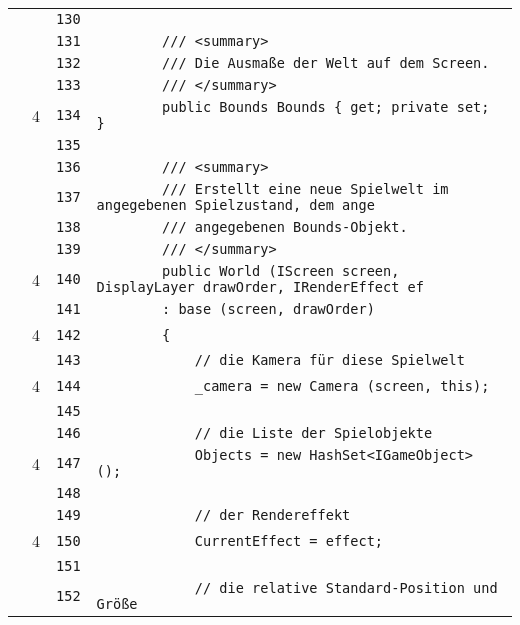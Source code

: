 \documentclass[a4paper,10pt]{article}
\begin{document}
\begin{longtable}[l]{lrrl}
\cellcolor{gray} &  & \verb~130~ & \verb~~\\
\cellcolor{gray} &  & \verb~131~ & \verb~        /// <summary>~\\
\cellcolor{gray} &  & \verb~132~ & \verb~        /// Die Ausmaße der Welt auf dem Screen.~\\
\cellcolor{gray} &  & \verb~133~ & \verb~        /// </summary>~\\
\cellcolor{green} & 4 & \verb~134~ & \verb~        public Bounds Bounds { get; private set; }~\\
\cellcolor{gray} &  & \verb~135~ & \verb~~\\
\cellcolor{gray} &  & \verb~136~ & \verb~        /// <summary>~\\
\cellcolor{gray} &  & \verb~137~ & \verb~        /// Erstellt eine neue Spielwelt im angegebenen Spielzustand, dem ange~\\
\cellcolor{gray} &  & \verb~138~ & \verb~        /// angegebenen Bounds-Objekt.~\\
\cellcolor{gray} &  & \verb~139~ & \verb~        /// </summary>~\\
\cellcolor{green} & 4 & \verb~140~ & \verb~        public World (IScreen screen, DisplayLayer drawOrder, IRenderEffect ef~\\
\cellcolor{gray} &  & \verb~141~ & \verb~        : base (screen, drawOrder)~\\
\cellcolor{green} & 4 & \verb~142~ & \verb~        {~\\
\cellcolor{gray} &  & \verb~143~ & \verb~            // die Kamera für diese Spielwelt~\\
\cellcolor{green} & 4 & \verb~144~ & \verb~            _camera = new Camera (screen, this);~\\
\cellcolor{gray} &  & \verb~145~ & \verb~~\\
\cellcolor{gray} &  & \verb~146~ & \verb~            // die Liste der Spielobjekte~\\
\cellcolor{green} & 4 & \verb~147~ & \verb~            Objects = new HashSet<IGameObject> ();~\\
\cellcolor{gray} &  & \verb~148~ & \verb~~\\
\cellcolor{gray} &  & \verb~149~ & \verb~            // der Rendereffekt~\\
\cellcolor{green} & 4 & \verb~150~ & \verb~            CurrentEffect = effect;~\\
\cellcolor{gray} &  & \verb~151~ & \verb~~\\
\cellcolor{gray} &  & \verb~152~ & \verb~            // die relative Standard-Position und Größe~\\

\end{longtable}
\end{document}

